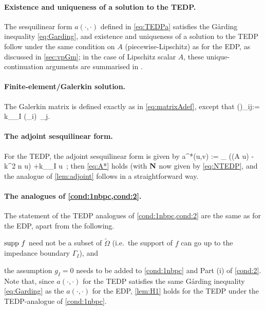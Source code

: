 \paragraph{Existence and uniqueness of a solution to the TEDP.} The sesquilinear form $a(\cdot,\cdot)$ defined in \cref{eq:TEDPa} satisfies the G\aa rding inequality \cref{eq:Garding}, and existence and uniqueness of a solution to the TEDP follow under the same condition on $A$ (piecewise-Lipschitz) as for the EDP, as discussed in \cref{sec:vpGm}; in the case of Lipschitz scalar $A$, these unique-continuation arguments are summarised in \cite[\S2]{GrSa:18}.

\paragraph{Finite-element/Galerkin solution.}
The Galerkin matrix is defined exactly as in \cref{eq:matrixAdef}, except that 
\beq\label{eq:NTEDP}
\big(\Nmat\big)_{ij}:= \ri k\int_{\Gamma_I}  (\gamma\phi_i) \,\gamma \phi_j.
\eeq

\paragraph{The adjoint sesquilinear form.} For the TEDP, the adjoint sesquilinear form is given by 
\beq\label{eq:TEDPadjoint}
a^*(u,v) := \int_{\DR} 
\Big((A \grad u)\cdot\grad \vb
 - k^2 n u\vb\Big) +\ri k\int_{\Gamma_I} \gamma u\, ;
\eeq
then \cref{eq:A*} holds (with $\mathbf{N}$ now given by \cref{eq:NTEDP}, and the analogue of \cref{lem:adjoint} follows in a straightforward way.


\paragraph{The analogues of \cref{cond:1nbpc,cond:2}.}
The statement of the TEDP analogues of \cref{cond:1nbpc,cond:2} are the same as for the EDP, apart from the following.
\ben
\item
$\operatorname{supp} \,f$ need not be a subset of $\widetilde{\Omega}$ (i.e.~the support of $f$ can go up to the impedance boundary $\Gamma_I$), and
\item the assumption $g_I= 0$ needs to be added to \cref{cond:1nbpc} and Part (i) of \cref{cond:2}.
\een
 Note that, since $a(\cdot,\cdot)$ for the TEDP satisfies the same G\aa rding inequality \cref{eq:Garding} as the $a(\cdot,\cdot)$ for the EDP, \cref{lem:H1} holds for the TEDP under the TEDP-analogue of \cref{cond:1nbpc}.

